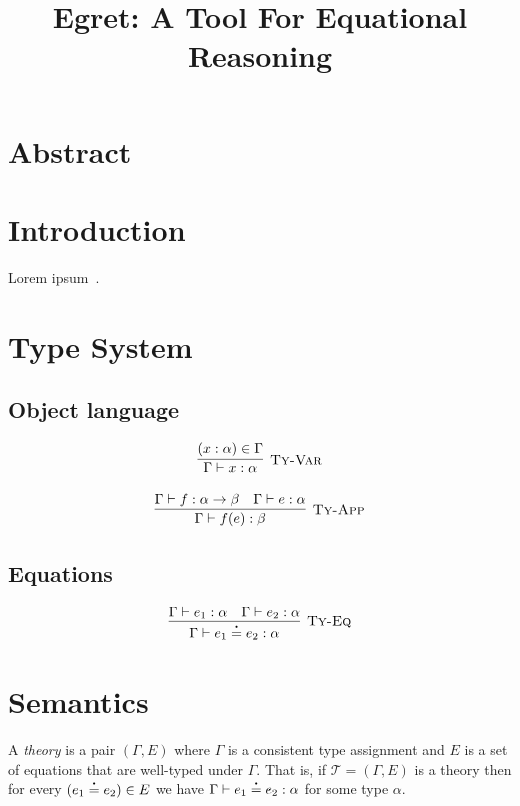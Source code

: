 \documentclass[runningheads]{llncs}
\begin{document}
\title{Egret: A Tool For Equational Reasoning}
\maketitle

\section{Abstract}

\section{Introduction}

Lorem ipsum~\cite{Elliott-2018-ad-extended}.

\section{Type System}

\subsection{Object language}
\[
  \begin{array}{c}
    \labinfer[Ty-Var]{\Gamma \vdash x : \alpha}{(x : \alpha) \in \Gamma}
    \\\\
    \labinfer[Ty-App]{\Gamma \vdash f(e) : \beta}{\Gamma \vdash f : \alpha \ra \beta & \Gamma \vdash e : \alpha}
  \end{array}
\]

\subsection{Equations}

\[
  \begin{array}{c}
    \labinfer[Ty-Eq]{\Gamma \vdash e_1 \eq e_2 : \alpha}{\Gamma \vdash e_1 : \alpha & \Gamma \vdash e_2 : \alpha}
  \end{array}
\]

\section{Semantics}

A \textit{theory} is a pair $(\Gamma, E)$ where $\Gamma$ is a consistent type assignment and $E$ is a set
of equations that are well-typed under $\Gamma$. That is, if $\mathcal{T} = (\Gamma, E)$ is a theory then for every $(e_1 \eq e_2) \in E$ we have $\Gamma \vdash e_1 \eq e_2 : \alpha$ for
some type $\alpha$.
\end{document}
